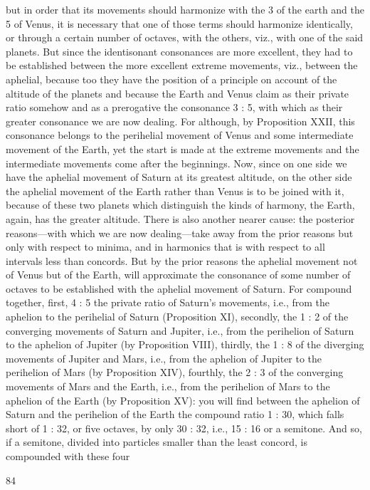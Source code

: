 \documentclass{article}
\begin{document}
but in order that its movements should harmonize with the 3 of the earth
and the 5 of Venus, it is necessary that one of those terms should
harmonize identically, or through a certain number of octaves, with the
others, viz., with one of the said planets. But since the identisonant
consonances are more excellent, they had to be established between the
more excellent extreme movements, viz., between the aphelial, because
too they have the position of a principle on account of the altitude of the
planets and because the Earth and Venus claim as their private ratio
somehow and as a prerogative the consonance 3 : 5, with which as their
greater consonance we are now dealing. For although, by Proposition
XXII, this consonance belongs to the perihelial movement of Venus and
some intermediate movement of the Earth, yet the start is made at the
extreme movements and the intermediate movements come after the
beginnings.
Now, since on one side we have the aphelial movement of Saturn at its
greatest altitude, on the other side the aphelial movement of the Earth
rather than Venus is to be joined with it, because of these two planets
which distinguish the kinds of harmony, the Earth, again, has the greater
altitude. There is also another nearer cause: the posterior reasons—with
which we are now dealing—take away from the prior reasons
but only with respect to minima, and in harmonics that is with respect to
all intervals less than concords. But by the prior reasons the aphelial
movement not of Venus but of the Earth, will approximate the
consonance of some number of octaves to be established with the
aphelial movement of Saturn. For compound together, first, 4 : 5 the
private ratio of Saturn's movements, i.e., from the aphelion to the
perihelial of Saturn (Proposition XI), secondly, the 1 : 2 of the converging
movements of Saturn and Jupiter, i.e., from the perihelion of Saturn to
the aphelion of Jupiter (by Proposition VIII), thirdly, the 1 : 8 of the
diverging movements of Jupiter and Mars, i.e., from the aphelion of
Jupiter to the perihelion of Mars (by Proposition XIV), fourthly, the 2 : 3
of the converging movements of Mars and the Earth, i.e., from the
perihelion of Mars to the aphelion of the Earth (by Proposition XV): you
will find between the aphelion of Saturn and the perihelion of the Earth
the compound ratio 1 : 30, which falls short of 1 : 32, or five octaves, by
only 30 : 32, i.e., 15 : 16 or a semitone. And so, if a semitone, divided into
particles smaller than the least concord, is compounded with these four


84
\end{document}
